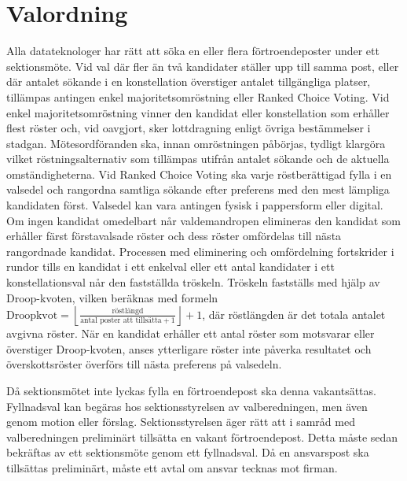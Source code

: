 \documentclass[a4paper]{dteklag}
\begin{document}
\section{Valordning}
\para [Inval] Alla datateknologer har rätt att söka en eller flera förtroendeposter under ett sektionsmöte.
\para Vid val där fler än två kandidater ställer upp till samma post, eller där antalet sökande i en konstellation överstiger antalet tillgängliga platser, tillämpas antingen enkel majoritetsomröstning eller Ranked Choice Voting.
\para Vid enkel majoritetsomröstning vinner den kandidat eller konstellation som erhåller flest röster och, vid oavgjort, sker lottdragning enligt övriga bestämmelser i stadgan.
\para Mötesordföranden ska, innan omröstningen påbörjas, tydligt klargöra vilket röstningsalternativ som tillämpas utifrån antalet sökande och de aktuella omständigheterna.
 Vid Ranked Choice Voting ska varje röstberättigad fylla i en valsedel och rangordna samtliga sökande efter preferens med den mest lämpliga kandidaten först.
\para Valsedel kan vara antingen fysisk i pappersform eller digital.
\para Om ingen kandidat omedelbart når valdemandropen elimineras den kandidat som erhåller färst förstavalsade röster och dess röster omfördelas till nästa rangordnade kandidat.
\para Processen med eliminering och omfördelning fortskrider i rundor tills en kandidat i ett enkelval eller ett antal kandidater i ett konstellationsval når den fastställda tröskeln.
\para Tröskeln fastställs med hjälp av Droop-kvoten, vilken beräknas med formeln \(\text{Droopkvot} = \left\lfloor \frac{\text{röstlängd}}{\text{antal poster att tillsätta} + 1} \right\rfloor + 1\), där röstlängden är det totala antalet avgivna röster.
\para När en kandidat erhåller ett antal röster som motsvarar eller överstiger Droop-kvoten, anses ytterligare röster inte påverka resultatet och överskottsröster överförs till nästa preferens på valsedeln.

\para[Vakantsättning] Då sektionsmötet inte lyckas fylla en förtroendepost ska denna vakantsättas.
\para[Fyllnadsval] Fyllnadsval kan begäras hos sektionsstyrelsen av valberedningen, men även genom motion eller förslag.
\para Sektionsstyrelsen äger rätt att i samråd med valberedningen preliminärt tillsätta en vakant förtroendepost.
\stycke Detta måste sedan bekräftas av ett sektionsmöte genom ett fyllnadsval.
\para Då en ansvarspost ska tillsättas preliminärt, måste ett avtal om ansvar tecknas mot firman.

\end{document}

